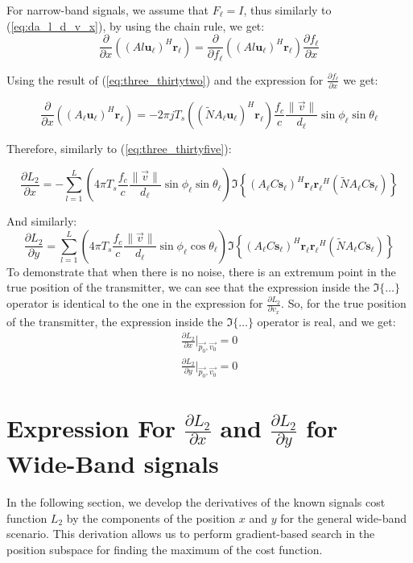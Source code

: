 For narrow-band signals, we assume that $F_\ell = I$, thus similarly to (\ref{eq:da_l_d_v_x}), by using the chain rule, we get:
\begin{equation}
\frac{\partial}{\partial x}\left( (Al \mathbf{u_\ell})^H \mathbf{r_\ell}\right) = \frac{\partial}{\partial f_\ell}\left( (Al \mathbf{u_\ell})^H \mathbf{r_\ell}\right) \frac{\partial f_\ell}{\partial x}
\end{equation}

Using the result of (\ref{eq:three_thirtytwo}) and the expression for $\frac{\partial f_\ell}{\partial x}$ we get:

\begin{equation}
\frac{\partial}{\partial x}((A_\ell \mathbf{u_\ell})^H \mathbf{r_\ell}) = - 2 \pi j T_s ((\tilde{N} A_\ell \mathbf{u_\ell})^H\mathbf{r_\ell})\frac{f_c}{c}\frac{\|\vec{v}\|}{d_\ell} \sin \phi_\ell \sin \theta_\ell
\end{equation}

Therefore, similarly to (\ref{eq:three_thirtyfive}):

\begin{equation}
\frac{\partial L_2}{\partial x} = -\sum_{l=1}^L (4 \pi T_s \frac{f_c}{c}\frac{\|\vec{v}\|}{d_\ell}\sin \phi_\ell \sin \theta_\ell ) \Im
\left\{
(A_\ell C \mathbf{s_\ell})^H \mathbf{r_\ell}\mathbf{r_\ell}^H (\tilde{N}A_\ell C \mathbf{s_\ell})
\right\}
\end{equation}

And similarly:
\begin{equation}
\frac{\partial L_2}{\partial y} = \sum_{l=1}^L (4 \pi T_s \frac{f_c}{c}\frac{\|\vec{v}\|}{d_\ell}\sin \phi_\ell \cos \theta_\ell ) \Im
\left\{
(A_\ell C \mathbf{s_\ell})^H \mathbf{r_\ell}\mathbf{r_\ell}^H (\tilde{N}A_\ell C \mathbf{s_\ell})
\right\}
\end{equation}
To demonstrate that when there is no noise, there is an extremum point in the true position of the transmitter, we can see that the expression inside the $\Im\{\dots\}$ operator is identical to the one in the expression for $\frac{\partial L_2}{\partial v_x}$. So, for the true position of the transmitter, the
expression inside the $\Im\{\dots\}$ operator is real, and we get:
\begin{eqnarray}
\frac{\partial L_2}{\partial x}|_{\vec{p_0},\vec{v_0}} = 0 \\
\frac{\partial L_2}{\partial y}|_{\vec{p_0},\vec{v_0}}= 0 \nonumber
\end{eqnarray}

\section{Expression For $\frac{\partial L_2}{\partial x}$ and $\frac{\partial L_2}{\partial y}$ for Wide-Band signals}
\label{d_L2_dx_dy_WB}
In the following section, we develop the derivatives of the known signals cost function $L_2$ by the components of the position $x$ and $y$ for the general wide-band scenario. This derivation allows us to perform gradient-based search in the position subspace for finding the maximum of the cost function.\\

